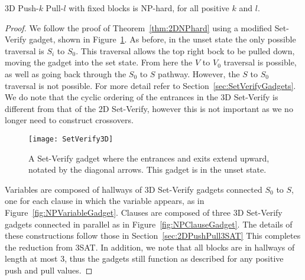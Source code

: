 \begin{theorem}
3D Push-$k$ Pull-$l$ with fixed blocks is NP-hard, for all positive $k$ and $l$.
\end{theorem}
\begin{proof}
We follow the proof of Theorem~\ref{thm:2DNPhard} using a modified Set-Verify gadget, shown in Figure~\ref{3DSetVerify}. As before, in the unset state the only possible traversal is $S_i$ to $S_0$. This traversal allows the top right bock to be pulled down, moving the gadget into the set state. From here the $V$ to $V_0$ traversal is possible, as well as going back through the $S_0$ to $S$ pathway. However, the $S$ to $S_0$ traversal is not possible. For more detail refer to Section~\ref{sec:SetVerifyGadgets}. We do note that the cyclic ordering of the entrances in the 3D Set-Verify is different from that of the 2D Set-Verify, however this is not important as we no longer need to construct crossovers.

  \begin{figure}[t]
    \centering
    \texttt{[image: SetVerify3D]}
    \caption{A Set-Verify gadget where the entrances and exits extend upward, notated by the diagonal arrows. This gadget is in the unset state.}
    \label{3DSetVerify}
  \end{figure}

Variables are composed of hallways of 3D Set-Verify gadgets connected $S_0$ to $S$, one for each clause in which the variable appears, as in Figure~\ref{fig:NPVariableGadget}. Clauses are composed of three 3D Set-Verify gadgets connected in parallel as in Figure~\ref{fig:NPClauseGadget}. The details of these constructions follow those in Section~\ref{sec:2DPushPull3SAT} This completes the reduction from 3SAT. In addition, we note that all blocks are in hallways of length at most 3, thus the gadgets still function as described for any positive push and pull values.
\end{proof}




